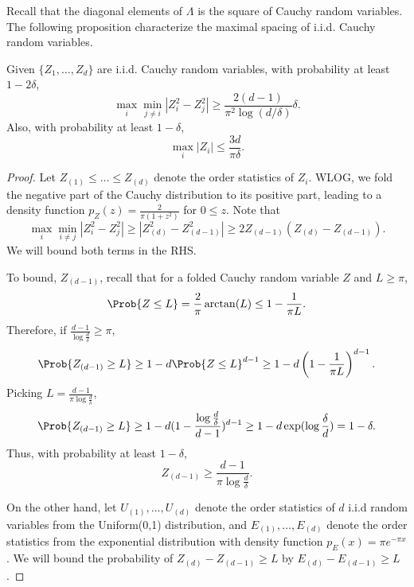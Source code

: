 Recall that the diagonal elements of $\Lambda$ is the square of Cauchy random variables. The following proposition characterize the maximal spacing of i.i.d. Cauchy random variables.
\begin{prop}
\label{prop:maximalGapCauchy}
Given $\{Z_1,\ldots, Z_d\}$ are i.i.d. Cauchy random variables, with probability at least $1-2\delta$, 
\[
\max_i \min_{j\neq i} |Z_i^2 - Z_j^2| \ge \frac{2(d-1)}{\pi^2 \log(d/\delta)}\delta.
\]
Also, with probability at least $1-\delta$,
\[
\max_i |Z_i| \le \frac{3d}{\pi\delta}.
\]
\end{prop}
\begin{proof}
Let $Z_{(1)}\le \ldots \le Z_{(d)}$ denote the order statistics of $Z_i$. 
WLOG, we fold the negative part of the Cauchy distribution to its positive part, leading to a density function $p_Z(z) = \frac{2}{\pi (1+z^2)}$ for $0\le z$.
Note that 
\[
\max_i \min_{i\neq j} |Z_i^2 - Z_j^2| \ge |Z_{(d)}^2 - Z_{(d-1)}^2| \ge 2Z_{(d-1)} \left(Z_{(d)} - Z_{(d-1)}\right).
\]
We will bound both terms in the RHS.

To bound, $Z_{(d-1)}$, recall that for a folded Cauchy random variable $Z$ and $L\ge \pi$,
\[
\Prob{Z \le L} = \frac{2}{\pi} \arctan(L) \le 1- \frac{1}{\pi L}.
\] 
Therefore, if $\frac{d-1}{\log \frac{d}{\delta}} \ge \pi$,
\[
\Prob{Z_{(d-1)} \ge L} \ge 1-d\Prob{Z\le L}^{d-1} \ge 1- d\left(1-  \frac{1}{\pi L}\right)^{d-1}.
\]
Picking $L = \frac{d-1}{\pi\log \frac{d}{\delta}}$,
\[
\Prob{Z_{(d-1)} \ge L} \ge 1- d(1- \frac{\log \frac{d}{\delta}}{d-1})^{d-1} \ge 1-d\exp(\log \frac{\delta}{d}) = 1-\delta.
\]
Thus, with probability at least $1- \delta$, 
\[
Z_{(d-1)} \ge \frac{d-1}{\pi\log \frac{d}{\delta}}.
\]

On the other hand, let $U_{(1)}, \ldots, U_{(d)}$ denote the order statistics of $d$ i.i.d random variables from the Uniform(0,1) distribution, and $E_{(1)}, \ldots, E_{(d)}$ denote the order statistics from the exponential distribution with density function $p_E(x) = \pi e^{-\pi x}$. 
We will bound the probability of $Z_{(d)} - Z_{(d-1)} \ge L$ by $E_{(d)} - E_{(d-1)} \ge L$.


\end{proof}
